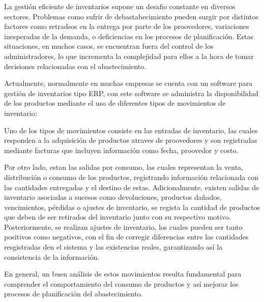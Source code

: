 La gestión eficiente de inventarios supone un desafio constante en diversos sectores. Problemas como sufrir de debastabecimiento pueden surgir por distintos factores como retradsos en la entrega por parte de los proovedores, variaciones inesperadas de la demanda, o deficiencias en los procesos de planificación. Estas situaciones, en muchos casos, se encuentran fuera del control de los administradores, lo que incrementa la complejidad para ellos a la hora de tomar decisiones relacionadas con el abastecimiento.

Actualmente, normalmente en muchas empresas se cuenta con un software para gestión de inventarios tipo ERP, con este software se administra la disponibilidad de los productos mediante el uso de diferentes tipos de movimientos de inventario:

Uno de los tipos de movimientos consiste en las entradas de inventario, las cuales responden a la adquisición de productos atraves de proovedores y son registradas mediante facturas que incluyen información como fecha, proovedor y costo. 

Por otro lado, estan las salidas por consumo, las cuales representan la venta, distribución o consumo de los productos, registrando información relacionada con las cantidades entregadas y el destino de estas. Adicionalmente, existen salidas de inventario asociadas a sucesos como devoluciones, productos dañados, vencimientos, pérdidas o ajustes de inventario, se regista la cantidad de productos que deben de ser retirados del inventario junto con su respectivo motivo. Posteriormente, se realizan ajustes de inventario, los cuales pueden ser tanto positivos como negativos, con el fin de corregir diferencias entre las cantidades resgistradas den el sistema y las existencias reales, garantizando así la consistencia de la información.

En general, un buen análisis de estos movimientos resulta fundamental para comprender el comportamiento del consumo de productos y así mejorar los procesos de planificación del abastecimiento.
